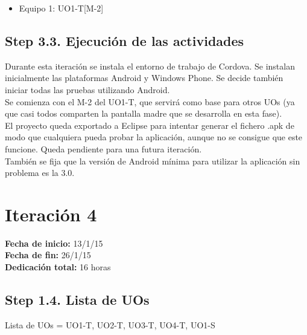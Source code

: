 \begin{itemize}
\item Equipo 1: UO1-T[M-2]
\end{itemize}

\subsection{Step 3.3. Ejecución de las actividades}
\label{it2:3.3}

Durante esta iteración se instala el entorno de trabajo de Cordova. Se instalan inicialmente las plataformas Android y Windows Phone. Se decide también iniciar todas las pruebas utilizando Android.\\

Se comienza con el M-2 del UO1-T, que servirá como base para otros UOs (ya que casi todos comparten la pantalla madre que se desarrolla en esta fase).\\

El proyecto queda exportado a Eclipse para intentar generar el fichero .apk de modo que cualquiera pueda probar la aplicación, aunque no se consigue que este funcione. Queda pendiente para una futura iteración.\\

También se fija que la versión de Android mínima para utilizar la aplicación sin problema es la 3.0.\\


\section{Iteración 4}
\label{it4}

\begin{flushleft}
\textbf{Fecha de inicio:} 13/1/15\\
\textbf{Fecha de fin:} 26/1/15\\
\textbf{Dedicación total:} 16 horas\\
\end{flushleft}

\subsection{Step 1.4. Lista de UOs}
\label{it4:1.4}

Lista de UOs = {UO1-T, UO2-T, UO3-T, UO4-T, UO1-S}


